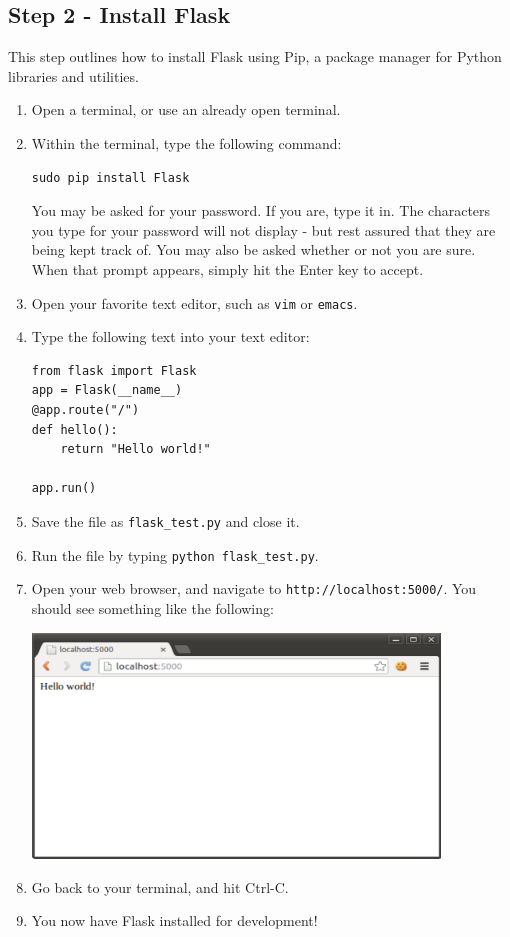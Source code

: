 \documentclass{article}
\begin{document}
\subsection{Step 2 - Install Flask}
This step outlines how to install Flask using Pip, a package manager for Python libraries and utilities.
\begin{enumerate}
\item Open a terminal, or use an already open terminal.
\item Within the terminal, type the following command:
\begin{verbatim}
sudo pip install Flask
\end{verbatim}
You may be asked for your password. If you are, type it in. The characters you type for your password
will not display - but rest assured that they are being kept track of. You
may also be asked whether or not you  are sure. When that prompt appears, 
simply hit the Enter key to accept.
\item Open your favorite text editor, such as \verb+vim+ or \verb+emacs+. \pagebreak
\item Type the following text into your text editor:
\begin{verbatim}
from flask import Flask
app = Flask(__name__)
@app.route("/")
def hello():
    return "Hello world!"

app.run()
\end{verbatim}
\item Save the file as \verb+flask_test.py+ and close it.
\item Run the file by typing \verb+python flask_test.py+.
\item Open your web browser, and navigate to \verb+http://localhost:5000/+. You should see something like the following:

\includegraphics[height=6cm]{pic2.png}
\item Go back to your terminal, and hit Ctrl-C.
\item You now have Flask installed for development!
\end{enumerate}
\end{document}
